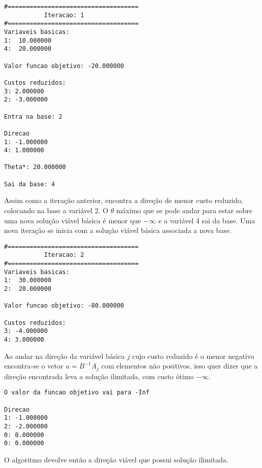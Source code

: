 \documentclass[
	12pt,				%
	openright,			%
	oneside,			%
	a4paper,			%
	english,			%
	french,				%
	spanish,			%
	brazil,				%
	]{abntex2}
\begin{document}
\begin{verbatim}
#====================================
           Iteracao: 1
#====================================
Variaveis basicas:
1:  10.000000
4:  20.000000

Valor funcao objetivo: -20.000000

Custos reduzidos:
3: 2.000000
2: -3.000000

Entra na base: 2

Direcao
1: -1.000000
4: 1.000000

Theta*: 20.000000

Sai da base: 4
\end{verbatim}

Assim como a iteração anterior, encontra a direção de menor custo reduzido, colocando na base a variável 2. O $\theta$ máximo que se pode andar para estar sobre uma nova solução viável básica é menor que $-\infty$ e a variável 4 sai da base.
Uma nova iteração se inicia com a solução viável básica associada a nova base.

\begin{verbatim}
#====================================
           Iteracao: 2
#====================================
Variaveis basicas:
1:  30.000000
2:  20.000000

Valor funcao objetivo: -80.000000

Custos reduzidos:
3: -4.000000
4: 3.000000
\end{verbatim}

Ao andar na direção da variável básica $j$ cujo custo reduzido é o menor negativo encontra-se o vetor $u = B^{-1}A_j$ com elementos não positivos, isso quer dizer que a direção encontrada leva a solução ilimitada, com custo ótimo $-\infty$.

\begin{verbatim}
O valor da funcao objetivo vai para -Inf

Direcao
1: -1.000000
2: -2.000000
0: 0.000000
0: 0.000000
\end{verbatim}
O algoritmo devolve então a direção viável que possui solução ilimitada.

 
%
%
%
%
\end{document}
